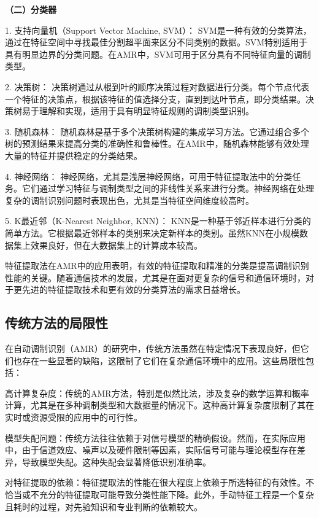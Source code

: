 \textbf{（二）分类器}

1. 支持向量机（Support Vector Machine, SVM）：
   SVM是一种有效的分类算法，通过在特征空间中寻找最佳分割超平面来区分不同类别的数据。SVM特别适用于具有明显边界的分类问题。在AMR中，SVM可用于区分具有不同特征向量的调制类型。

2. 决策树：
   决策树通过从根到叶的顺序决策过程对数据进行分类。每个节点代表一个特征的决策点，根据该特征的值选择分支，直到到达叶节点，即分类结果。决策树易于理解和实现，适用于具有明显特征规则的调制类型识别。

3. 随机森林：
   随机森林是基于多个决策树构建的集成学习方法。它通过组合多个树的预测结果来提高分类的准确性和鲁棒性。在AMR中，随机森林能够有效处理大量的特征并提供稳定的分类结果。

4. 神经网络：
   神经网络，尤其是浅层神经网络，可用于特征提取法中的分类任务。它们通过学习特征与调制类型之间的非线性关系来进行分类。神经网络在处理复杂的调制识别问题时表现出色，尤其是当特征空间维度较高时。

5. K最近邻（K-Nearest Neighbor, KNN）：
   KNN是一种基于邻近样本进行分类的简单方法。它根据最近邻样本的类别来决定新样本的类别。虽然KNN在小规模数据集上效果良好，但在大数据集上的计算成本较高。

特征提取法在AMR中的应用表明，有效的特征提取和精准的分类是提高调制识别性能的关键。随着通信技术的发展，尤其是在面对更复杂的信号和通信环境时，对于更先进的特征提取技术和更有效的分类算法的需求日益增长。

\subsection{传统方法的局限性}\label{sec:background}

在自动调制识别（AMR）的研究中，传统方法虽然在特定情况下表现良好，但它们也存在一些显著的缺陷，这限制了它们在复杂通信环境中的应用。这些局限性包括：

高计算复杂度：传统的AMR方法，特别是似然比法，涉及复杂的数学运算和概率计算，尤其是在多种调制类型和大数据量的情况下。这种高计算复杂度限制了其在实时或资源受限的应用中的可行性。

模型失配问题：传统方法往往依赖于对信号模型的精确假设。然而，在实际应用中，由于信道效应、噪声以及硬件限制等因素，实际信号可能与理论模型存在差异，导致模型失配。这种失配会显著降低识别准确率。

对特征提取的依赖：特征提取法的性能在很大程度上依赖于所选特征的有效性。不恰当或不充分的特征提取可能导致分类性能下降。此外，手动特征工程是一个复杂且耗时的过程，对先验知识和专业判断的依赖较大。

